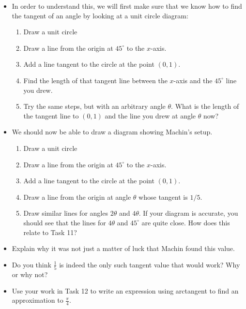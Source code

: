 \documentclass[11pt]{article}
\newcounter{tasknumb}
\newcommand{\tasknumb}{\stepcounter{tasknumb}\textmd{\textbf{$\fbox{$\fbox{Task \thetasknumb}$}$}}}
\newenvironment{task}%
 {\begin{itemize}
 \item[\tasknumb]  }
{
    \end{itemize}    }%
\begin{document}
\begin{task}
In order to understand this, we will first make sure that we know how to find the tangent of an angle by looking at a unit circle diagram:
\begin{enumerate}
\item Draw a unit circle
\item Draw a line from the origin at $45^\circ$ to the $x$-axis.
\item Add a line tangent to the circle at the point $(0,1)$.
\item Find the length of that tangent line between the $x$-axis and the $45^\circ$ line you drew.
\item Try the same steps, but with an arbitrary angle $\theta$. What is the length of the tangent line to $(0,1)$ and the line you drew at angle $\theta$ now?
\end{enumerate}
\end{task}

\begin{task}

We should now be able to draw a diagram showing Machin's setup.

\begin{enumerate}
\item Draw a unit circle
\item Draw a line from the origin at $45^\circ$ to the $x$-axis.
\item Add a line tangent to the circle at the point $(0,1)$.
\item Draw a line from the origin at angle $\theta$ whose tangent is $1/5$.
\item Draw similar lines for angles $2\theta$ and $4\theta$. If your diagram is accurate, you should see that the lines for $4\theta$ and $45^\circ$ are quite close. How does this relate to Task 11?
\end{enumerate}
\end{task}

\begin{task}
Explain why it was not just a matter of luck that Machin found this value.
\end{task}

\begin{task}
Do you think $\frac{1}{5}$ is indeed the only such tangent value that would work?  Why or why not?
\end{task}

\begin{task}
Use your work in Task 12 to write an expression using arctangent to find an approximation to $\frac{\pi}{4}$.
\end{task}
\end{document}
